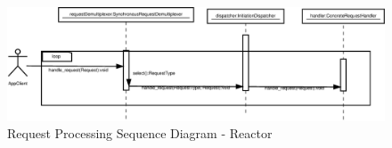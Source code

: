 
\begin{figure}
	\centering
	\includegraphics*[width=1\textwidth, keepaspectratio=false]{fig/image32.eps}
	\caption{Request Processing Sequence Diagram - Reactor}
	\label{fig:seq_diagram_r2}
\end{figure}




